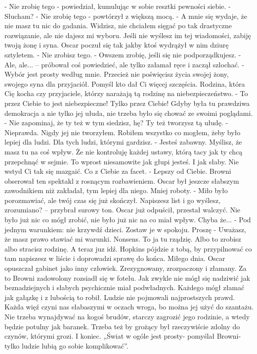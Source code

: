 \documentclass[12pt,a4paper]{book}
\begin{document}
- Nie zrobię tego - powiedział, kumulując w sobie resztki pewności siebie. 
- Słucham? 
- Nie zrobię tego - powtórzył z większą mocą. 
- A mnie się wydaje, że nie masz tu nic do gadania. Widzisz, nie chciałem sięgać po tak drastyczne rozwiązanie, ale nie dajesz mi wyboru. Jeśli nie wyślesz im tej wiadomości, zabiję twoją żonę i syna. 
Oscar poczuł się tak jakby ktoś wydrążył w nim dziurę sztyletem.  
- Nie zrobisz tego. 
- Owszem zrobię, jeśli się nie podporządkujesz. 
- Ale, ale... – próbował coś powiedzieć, ale tylko załamał ręce i zaczął szlochać. 
- Wybór jest prosty według mnie. Przecież nie poświęcisz życia swojej żony, swojego syna dla przyjaciół. Pomyśl kto dał Ci więcej szczęścia. Rodzina, która Cię kocha czy przyjaciele, którzy narażają tą rodzinę na niebezpieczeństwo. 
- To przez Ciebie to jest niebezpieczne! Tylko przez Ciebie! Gdyby była tu prawdziwa demokracja a nie tylko jej ułuda, nie trzeba było się chować ze swoimi poglądami. 
- Nie zapominaj, że ty też w tym siedzisz, hę? Ty też tworzysz tą ułudę. 
- Nieprawda. Nigdy jej nie tworzyłem. Robiłem wszystko co mogłem, żeby było lepiej dla ludzi. Dla tych ludzi, którymi gardzisz. 
- Jesteś zabawny. Myślisz, że masz tu na coś wpływ. Że nie kontroluję każdej ustawy, którą tacy jak ty chcą przepchnąć w sejmie. To wprost niesamowite jak głupi jesteś. I jak słaby. Nie wstyd Ci tak się mazgaić. Co z Ciebie za facet. 
- Lepszy od Ciebie. 
Browni obserował ten spektakl z rosnącym rozbawieniem. Oscar był jeszcze słabszym zawodnikiem niż zakładał, tym lepiej dla niego. Mniej roboty. 
- Miło było porozmawiać, ale twój czas się już skończył. Napiszesz list i go wyślesz, zrozumiano? – przybrał surowy ton.
Oscar już odpuścił, przestał walczyć. Nie było już nic co mógł zrobić, nie było już nic na co miał wpływ. Chyba że...
- Pod jednym warunkiem: nie krzywdź dzieci. Zostaw je w spokoju. Proszę
- Uważasz, że masz prawo stawiać mi warunki. Nonsens. To ja tu rządzię. Albo to zrobisz albo stracisz rodzinę. A teraz juz idź. Hopkins pójdzie z tobą, by przypilnować co tam napiszesz w liście i doprowadzi sprawę do końca. Miłego dnia. 
Oscar opuszczał gabinet jako inny człowiek. Zrezygnowany, zrozpaczony i złamany. 
Za to Browni zadowolony rozsiadł się w fotelu. Jak zwykle nie mógł się nadziwić jak beznadziejnych i słabych psychicznie miał podwładnych. Każdego mógł złamać jak gałązkę i z lubością to robił. Ludzie nie pojmowali najprostszych prawd. Każda więź czyni nas słabaszymi w oczach wroga, bo można jej użyć do szantażu. Nie trzeba wynajdywać na kogoś brudów, starczy zagrozić jego rodzinie, a wtedy będzie potulny jak baranek. Trzeba też by grożący był rzeczywiście zdolny do czynów, którymi grozi. I koniec. 
„Świat w ogóle jest prosty- pomyślał Browni- tylko ludzie lubią go sobie komplikować”.
\end{document}
